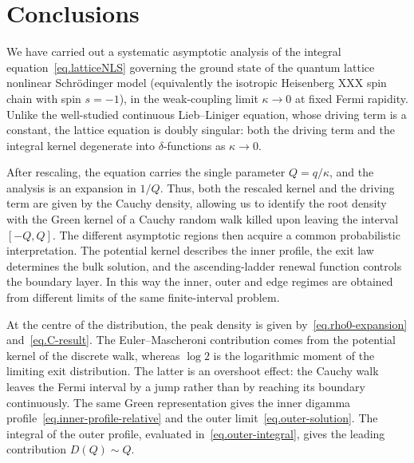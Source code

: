\documentclass[11pt,a4paper]{article}
\theoremstyle{definition}
\begin{document}
\section{Conclusions}
\label{sec.conclusions}

We have carried out a systematic asymptotic analysis of the integral equation~\eqref{eq.latticeNLS} 
governing the ground state of the quantum lattice nonlinear Schr\"odinger model
(equivalently the isotropic Heisenberg XXX spin chain with spin $s=-1$),
in the weak-coupling limit $\kappa\to 0$ at fixed Fermi rapidity.
Unlike the well-studied continuous Lieb--Liniger equation, whose driving term is a
constant, the lattice equation is doubly singular: both the driving term and
the integral kernel degenerate into $\delta$-functions as $\kappa\to 0$.

After rescaling, the equation carries the single parameter $Q = q/\kappa$, and
the analysis is an expansion in $1/Q$. 
Thus, both the rescaled kernel and the driving term are given by the Cauchy density, 
allowing us to identify the root density with the Green kernel of a Cauchy random walk
killed upon leaving the interval $[-Q,Q]$. The different asymptotic regions
then acquire a common probabilistic interpretation. The potential kernel
describes the inner profile, the exit law determines the bulk solution, and
the ascending-ladder renewal function controls the boundary layer. In this
way the inner, outer and edge regimes are obtained from different limits of
the same finite-interval problem.

At the centre of the distribution, the peak density is given
by~\eqref{eq.rho0-expansion} and~\eqref{eq.C-result}. The Euler--Mascheroni
contribution comes from the potential kernel of the discrete walk, whereas
$\log 2$ is the logarithmic moment of the limiting exit distribution. The
latter is an overshoot effect: the Cauchy walk leaves the Fermi interval by a
jump rather than by reaching its boundary continuously. The same Green
representation gives the inner digamma profile~\eqref{eq.inner-profile-relative} and
the outer limit~\eqref{eq.outer-solution}. The integral of the outer profile,
evaluated in~\eqref{eq.outer-integral}, gives the leading contribution
$D(Q)\sim Q$.
\end{document}
